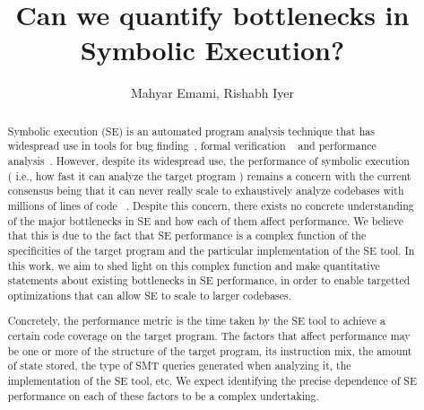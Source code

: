 \documentclass{hotnets2020}
\begin{document}


\title{Can we quantify bottlenecks in Symbolic Execution?}

\author{Mahyar Emami, Rishabh Iyer}

\maketitle

\begin{abstract}

Symbolic execution (SE) is an automated program analysis technique that has widespread use in tools for bug finding~\cite{klee,exe,sage}, formal verification ~\cite{hyperkernel,vigor,jitterbug} and performance analysis~\cite{castan,bolt,violet}. However, despite its widespread use, the performance of symbolic execution ( i.e., how fast it can analyze the target program ) remains a concern with the current consensus being that it can never really scale to exhaustively analyze codebases with millions of lines of code ~\cite{se_3decades}. Despite this concern, there exists no concrete understanding of the major bottlenecks in SE and how each of them affect  performance. We believe that this is due to the fact that SE performance is a complex function of the specificities of the target program and the particular implementation of the SE tool. In this work, we aim to shed light on this complex function and make quantitative statements about existing bottlenecks in SE performance, in order to enable targetted optimizations that can allow SE to scale to larger codebases.

Concretely, the performance metric is the time taken by the SE tool to achieve a certain code coverage on the target program. The factors that affect performance may be one or more of the structure of the target program, its instruction mix, the amount of state stored, the type of SMT queries generated when analyzing it, the implementation of the SE tool, etc. We expect identifying the precise dependence of SE performance on each of these factors to be a complex undertaking.

\end{abstract}

\newpage
 
\begin{small}

\end{small}
\end{document}
